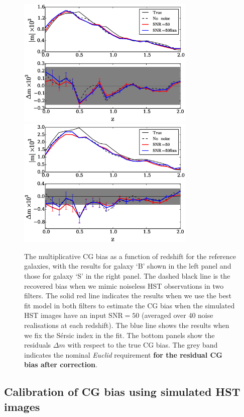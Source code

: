 \documentclass[useAMS,usenatbib]{mnras}
\begin{document}
\begin{figure}
  \centerline{
  \includegraphics[width=8.5cm]{zs2n_b_snrtt50.eps}
  \includegraphics[width=8.5cm]{zs2n_s_snrtt50.eps}}
\caption{The multiplicative CG bias as a function of redshift
  for the reference galaxies, with the results for galaxy `B' shown
  in the left panel and those for galaxy `S' in the right panel.
  The dashed black line is the recovered bias when we mimic
  noiseless HST observations in two filters. The solid red line
  indicates the results when we use the best fit {} model
  in both filters to estimate the CG bias when the simulated HST images have
  an input $\mathrm{SNR}=50$ (averaged over 40 noise realisations at each
  redshift). The blue line shows the results when we fix the S{\'e}rsic index
  in the fit. The bottom panels show the residuals $\Delta m$ with respect
  to the true CG bias. The grey band indicates the
  nominal {\it Euclid} requirement {\bf for the residual CG bias after correction}.}
\label{fig:biasofz50}
\end{figure}


\subsection{Calibration of CG bias using simulated HST images}
\label{sec:noisy}
\end{document}
